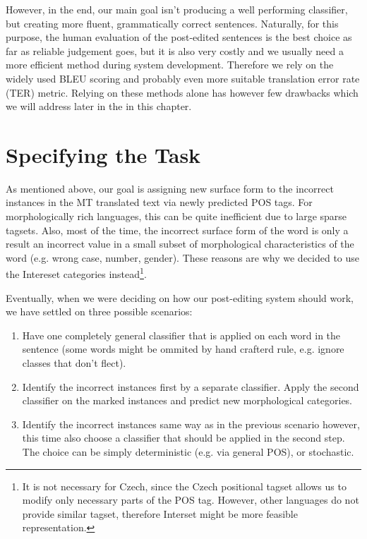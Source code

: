However, in the end, our main goal isn't producing a well performing classifier, but creating
more fluent, grammatically correct sentences.
Naturally, for this purpose, the human evaluation of the post-edited sentences is the best choice as far
as reliable judgement goes, but it is also very costly and we usually need a more efficient
method during system development. Therefore we rely on the widely used BLEU scoring and
probably even more suitable translation error rate (TER) metric. Relying on these methods alone
has however few drawbacks which we will address later in the in this chapter.

\section{Specifying the Task}

As mentioned above, our goal is assigning new surface form to the incorrect instances
in the MT translated text via newly predicted POS tags. For morphologically rich languages,
this can be quite inefficient due to large sparse tagsets. Also, most of the time,
the incorrect surface form of the word is only a result an incorrect value in a small
subset of morphological characteristics of the word (e.g. wrong case, number, gender).
These reasons are why we decided to use the Intereset categories instead\footnote{It is
not necessary for Czech, since the Czech positional tagset allows us to modify only necessary
parts of the POS tag. However, other languages do not provide similar tagset, therefore
Interset might be more feasible representation.}.

Eventually, when we were deciding on how our post-editing system should work, we have settled on three possible scenarios:
\begin{enumerate}
    \item Have one completely general classifier that is applied on each word in the sentence (some
        words might be ommited by hand crafterd rule, e.g. ignore classes that don't flect).
    \item Identify the incorrect instances first by a separate classifier. Apply the second classifier
        on the marked instances and predict new morphological categories.
    \item Identify the incorrect instances same way as in the previous scenario however, this time also choose a classifier that
        should be applied in the second step. The choice can be simply deterministic (e.g. via general POS), or stochastic.
\end{enumerate}

